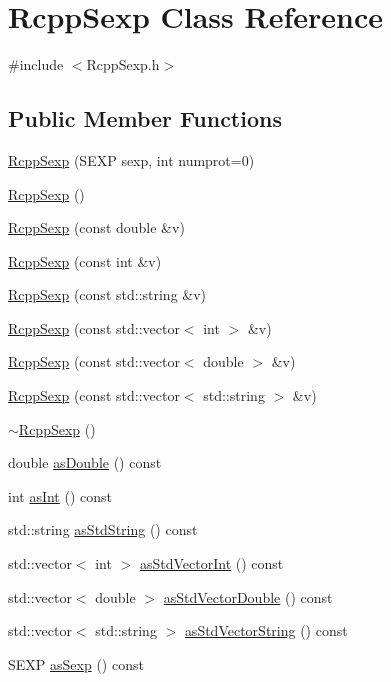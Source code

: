 \hypertarget{classRcppSexp}{
\section{RcppSexp Class Reference}
\label{classRcppSexp}
}


{\ttfamily \#include $<$RcppSexp.h$>$}\subsection*{Public Member Functions}
\begin{DoxyCompactItemize}
\item 
\hyperlink{classRcppSexp_ac04b17cce83078dff3bfa9b200e9bbef}{RcppSexp} (SEXP sexp, int numprot=0)
\item 
\hyperlink{classRcppSexp_a78fc5fb126d388f9c4c3e9febcc95229}{RcppSexp} ()
\item 
\hyperlink{classRcppSexp_acf6fc00ffd9616dea4926baf40e6f77d}{RcppSexp} (const double \&v)
\item 
\hyperlink{classRcppSexp_a2ddf3900d04a52a59e15faebe83a4e8b}{RcppSexp} (const int \&v)
\item 
\hyperlink{classRcppSexp_a0876ffb6bdb82d6fe2f30a6a73d51dbb}{RcppSexp} (const std::string \&v)
\item 
\hyperlink{classRcppSexp_ab276f77e2cc03da2d60d8826d095d757}{RcppSexp} (const std::vector$<$ int $>$ \&v)
\item 
\hyperlink{classRcppSexp_addfe0bf529d5adc8cfd3729035676cf1}{RcppSexp} (const std::vector$<$ double $>$ \&v)
\item 
\hyperlink{classRcppSexp_a72d7ac372a23dcb2d8e7752afc7f07ac}{RcppSexp} (const std::vector$<$ std::string $>$ \&v)
\item 
\hyperlink{classRcppSexp_a54cb551beed3570ca0a1aa0566d512cf}{$\sim$RcppSexp} ()
\item 
double \hyperlink{classRcppSexp_a418a55a88fe2161d2bce11dbe1d49153}{asDouble} () const 
\item 
int \hyperlink{classRcppSexp_abf1d0f9b957e14e1ed3846eac93c7ccd}{asInt} () const 
\item 
std::string \hyperlink{classRcppSexp_ade685360b8c743411135def23f229911}{asStdString} () const 
\item 
std::vector$<$ int $>$ \hyperlink{classRcppSexp_af380f8a164c537a8e99da54660ed5870}{asStdVectorInt} () const 
\item 
std::vector$<$ double $>$ \hyperlink{classRcppSexp_a44f99ee7521861aff309dc008b788868}{asStdVectorDouble} () const 
\item 
std::vector$<$ std::string $>$ \hyperlink{classRcppSexp_a74c199ef6a4a954ebe035a0951d303a3}{asStdVectorString} () const 
\item 
SEXP \hyperlink{classRcppSexp_ad55b673427e49062e2f3ec493160d1e3}{asSexp} () const 
\end{DoxyCompactItemize}
